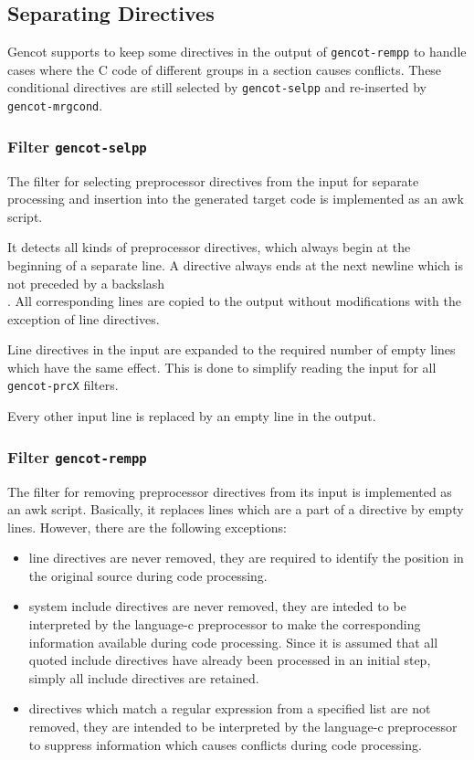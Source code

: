 \documentclass[a4paper]{report}
\newcommand{\code}[1]{\textnormal{\texttt{#1}}}
\begin{document}
\subsection{Separating Directives}

Gencot supports to keep some directives in the output of \code{gencot-rempp} to handle cases where
the C code of different groups in a section causes conflicts. These conditional directives are still selected
by \code{gencot-selpp} and re-inserted by \code{gencot-mrgcond}. 

\subsubsection{Filter \code{gencot-selpp}}

The filter for selecting preprocessor directives from the input for separate processing and insertion into
the generated target code is implemented as an awk script.

It detects all kinds of preprocessor directives, which always begin at the beginning of a separate line.
A directive always ends at the next newline which is not preceded by a backslash \code{\\}. All corresponding
lines are copied to the output without modifications with the exception of line directives.

Line directives in the input are expanded to the required number of empty lines
which have the same effect. This is done to simplify reading the input for all \code{gencot-prcX} filters.

Every other input line is replaced by an empty line in the output.

\subsubsection{Filter \code{gencot-rempp}}

The filter for removing preprocessor directives from its input is implemented as an awk script.
Basically, it replaces lines which are a part of a directive by empty lines. However, there are the following
exceptions:
\begin{itemize}
\item line directives are never removed, they are required to identify the position in the original source
during code processing.
\item system include directives are never removed, they are inteded to be interpreted by the language-c
preprocessor to make the corresponding information available during code processing. Since it is assumed that
all quoted include directives have already been processed in an initial step, simply all include
directives are retained.
\item directives which match a regular expression from a specified list are not removed, they are intended
to be interpreted by the language-c preprocessor to suppress information which causes conflicts during code
processing.
\end{itemize}
\end{document}

